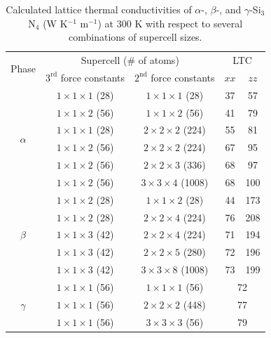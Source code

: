 \documentclass[twocolumn,amsmath,amssymb,a4paper,prb,superscriptaddress,floatfix]{revtex4-1}
\begin{document}
\begin{table}[ht]
        \caption{\label{table:LTC} Calculated lattice thermal conductivities
 of $\alpha$-, $\beta$-, and $\gamma$-Si$_3$N$_4$
 (W K$^{-1}$ m$^{-1}$) at 300 K with respect to several combinations of
 supercell sizes.}
 \begin{ruledtabular}
  \begin{tabular}{ccccc}
   \multirow{2}{*}{Phase}
   & \multicolumn{2}{c}{Supercell (\# of atoms)} &
   \multicolumn{2}{c}{LTC} \\
   \cline{2-5}
   & $3^\text{rd}$ force constants & $2^\text{nd}$ force constants & $xx$ & $zz$ \\
   \hline
   \multirow{6}{*}{$\alpha$}
   & $1\times 1\times 1$ (28) & $1\times
   1\times 1$ (28) & 37 &   57 \\
   & $1\times 1\times 2$ (56) & $1\times
   1\times 2$ (56) & 41 &   79 \\
   & $1\times 1\times 1$ (28) & $2\times
   2\times 2$ (224) & 55 &   81 \\
   & $1\times 1\times 2$ (56) & $2\times
   2\times 2$ (224) & 67 &   95 \\
   & $1\times 1\times 2$ (56) & $2\times
   2\times 3$ (336) & 68 &  97 \\
   & $1\times 1\times 2$ (56) & $3\times
   3\times 4$ (1008) & 68 &  100 \\
   \hline
   \multirow{5}{*}{$\beta$}
   & $1\times 1\times 2$ (28) & $1\times
   1\times 2$ (28) & 44 & 173 \\
   & $1\times 1\times 2$ (28) & $2\times
   2\times 4$ (224) & 76 &  208 \\
   & $1\times 1\times 3$ (42) & $2\times
   2\times 4$ (224) & 71 & 194 \\
   & $1\times 1\times 3$ (42) & $2\times
   2\times 5$ (280) & 72 & 196 \\
   & $1\times 1\times 3$ (42) & $3\times
   3\times 8$ (1008) & 73 & 199 \\
   \hline
   \multirow{3}{*}{$\gamma$}
   & $1\times 1\times 1$ (56) & $1\times
   1\times 1$ (56) & \multicolumn{2}{c}{72} \\
   & $1\times 1\times 1$ (56) & $2\times
   2\times 2$ (448) & \multicolumn{2}{c}{77} \\
   & $1\times 1\times 1$ (56) & $3\times
   3\times 3$ (56) & \multicolumn{2}{c}{79} \\
  \end{tabular}
 \end{ruledtabular}
\end{table}
\end{document}
